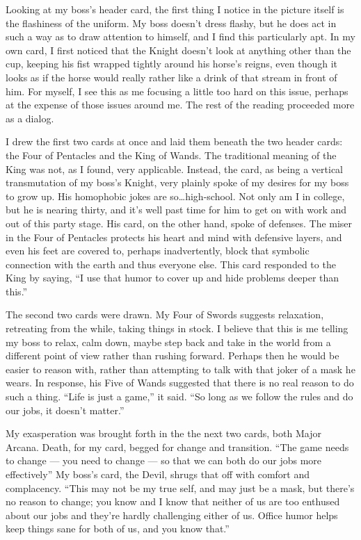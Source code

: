 Looking at my boss's header card, the first thing I notice in the picture
itself is the flashiness of the uniform.  My boss doesn't dress flashy,
but he does act in such a way as to draw attention to himself, and I
find this particularly apt.  In my own card, I first noticed that the
Knight doesn't look at anything other than the cup, keeping his fist
wrapped tightly around his horse's reigns, even though it looks as if
the horse would really rather like a drink of that stream in front of
him.  For myself, I see this as me focusing a little too hard on this
issue, perhaps at the expense of those issues around me.  The rest of
the reading proceeded more as a dialog.

I drew the first two cards at once and laid them beneath the two header
cards: the Four of Pentacles and the King of Wands.  The traditional
meaning of the King was not, as I found, very applicable.  Instead, the
card, as being a vertical transmutation of my boss's Knight, very
plainly spoke of my desires for my boss to grow up.  His homophobic
jokes are so\ldots high-school.  Not only am I in college, but he is
nearing thirty, and it's well past time for him to get on with work and
out of this party stage.  His card, on the other hand, spoke of
defenses.  The miser in the Four of Pentacles protects his heart and
mind with defensive layers, and even his feet are covered to, perhaps
inadvertently, block that symbolic connection with the earth and thus
everyone else.  This card responded to the King by saying, ``I use that
humor to cover up and hide problems deeper than this.''

The second two cards were drawn.  My Four of Swords suggests relaxation,
retreating from the while, taking things in stock.  I believe that this
is me telling my boss to relax, calm down, maybe step back and take in
the world from a different point of view rather than rushing forward.
Perhaps then he would be easier to reason with, rather than attempting
to talk with that joker of a mask he wears.  In response, his Five of
Wands suggested that there is no real reason to do such a thing.  ``Life
is just a game,'' it said.  ``So long as we follow the rules and do our
jobs, it doesn't matter.''

My exasperation was brought forth in the the next two cards, both Major
Arcana.  Death, for my card, begged for change and transition.  ``The
game needs to change --- you need to change --- so that we can both do
our jobs more effectively''  My boss's card, the Devil, shrugs that off
with comfort and complacency.  ``This may not be my true self, and may
just be a mask, but there's no reason to change; you know and I know
that neither of us are too enthused about our jobs and they're hardly
challenging either of us.  Office humor helps keep things sane for both
of us, and you know that.''

